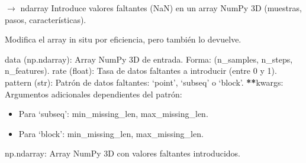 \documentclass[letterpaper,10pt,english]{sphinxmanual}
\begin{document}
\begin{fulllineitems}
\label{\detokenize{pampaneira_imputation:pampaneira_imputation.utils.create_missingness}}
\pysigstartsignatures
\pysiglinewithargsret
{}
{\sphinxparamcomma {}\sphinxparamcomma {}\sphinxparamcomma {}}
{{ $\rightarrow$ ndarray}}
\pysigstopsignatures
\sphinxAtStartPar
Introduce valores faltantes (NaN) en un array NumPy 3D (muestras, pasos, características).

\sphinxAtStartPar
Modifica el array in situ por eficiencia, pero también lo devuelve.
\begin{description}
\sphinxAtStartPar
data (np.ndarray): Array NumPy 3D de entrada. Forma: (n\_samples, n\_steps, n\_features).
rate (float): Tasa de datos faltantes a introducir (entre 0 y 1).
pattern (str): Patrón de datos faltantes: ‘point’, ‘subseq’ o ‘block’.
{\color{red}\bfseries{}**}kwargs: Argumentos adicionales dependientes del patrón:
\begin{itemize}
\item {} 
\sphinxAtStartPar
Para ‘subseq’: min\_missing\_len, max\_missing\_len.

\item {} 
\sphinxAtStartPar
Para ‘block’: min\_missing\_len, max\_missing\_len.

\end{itemize}

\sphinxAtStartPar
np.ndarray: Array NumPy 3D con valores faltantes introducidos.

\end{description}

\end{fulllineitems}

\end{document}
